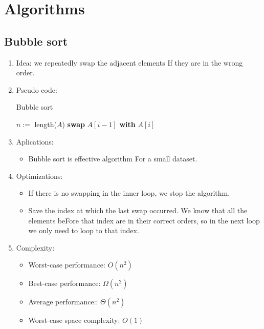 \documentclass[12pt]{article}
\begin{document}
\section{Algorithms}

    \subsection{Bubble sort}
    \begin{enumerate}
        \item Idea: we repeatedly swap the adjacent elements If they are in the wrong order.
        \item Pseudo code:
        \begin{algorithm}[H]
            \caption{Bubble sort}
            \begin{algorithmic}[1]
                    \State $n:=$ length($A$)
                                \State \textbf{swap} $A[i-1]$ \textbf{with} $A[i]$
                            \EndIf
                        \EndFor
                    \EndFor
                \EndFunction
            \end{algorithmic}
        \end{algorithm}
        \item Aplications:
        \begin{itemize}
            \item Bubble sort is effective algorithm For a small dataset.
        \end{itemize}
        \item Optimizations:
        \begin{itemize}
            \item If there is no swapping in the inner loop, we stop the algorithm.
            \item Save the index at which the last swap occurred. We know that all the elements beFore that index are in their correct orders, so in the next loop we only need to loop to that index.
        \end{itemize}
        \item Complexity:
        \begin{itemize}
            \item Worst-case performance: $O(n^2)$
            \item Best-case performance: $\Omega(n^2)$
            \item Average performance:: $\Theta(n^2)$
            \item Worst-case space complexity: $O(1)$
        \end{itemize}
    \end{enumerate}
    
\end{document}
